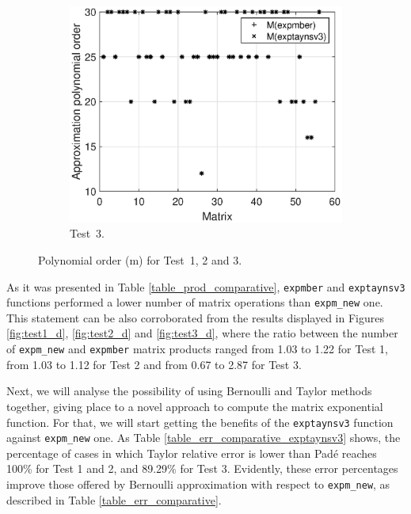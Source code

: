 \documentclass[preprint,10pt,numbers,sort&compress]{elsarticle}
\begin{document}
\begin{figure}[t]
\begin{subfigure}[b]{0.48\textwidth}
\vspace{12pt}
\end{subfigure}
\begin{subfigure}[b]{0.48\textwidth}
\includegraphics[scale=0.44]{Figures/polynomial_order_exp_toolbox_n128_nd256-exp_eigtool_n128_nd256_expmber.eps}
\caption{\footnotesize Test~3.}
\label{fig:m_value_test3}
\end{subfigure}
\caption{Polynomial order (m) for Test~1, 2 and 3.}
\label{fig:m_value}
\end{figure}

As it was presented in Table \ref{table_prod_comparative}, \texttt{expmber} and \texttt{exptaynsv3} functions performed a lower number of matrix operations than \texttt{expm\_new} one. This statement can be also corroborated from the results displayed in Figures \ref{fig:test1_d}, \ref{fig:test2_d} and \ref{fig:test3_d}, where the ratio between the number of \texttt{expm\_new} and \texttt{expmber} matrix products ranged from 1.03 to 1.22 for Test 1, from 1.03 to 1.12 for Test 2 and from 0.67 to 2.87 for Test 3.

Next, we will analyse the possibility of using Bernoulli and Taylor methods together, giving place to a novel approach to compute the matrix exponential function. For that, we will start getting the benefits of the \texttt{exptaynsv3} function against \texttt{expm\_new} one.  As Table \ref{table_err_comparative_exptaynsv3} shows, the percentage of cases in which Taylor relative error is lower than Pad\'e reaches 100\% for Test 1 and 2, and 89.29\% for Test 3. Evidently, these error percentages improve those offered by Bernoulli approximation with respect to \texttt{expm\_new}, as described in Table \ref{table_err_comparative}. 
\end{document}

